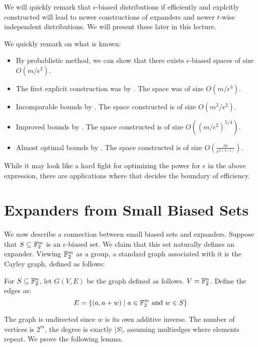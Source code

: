 We will quickly remark that $\epsilon$-biased distributions if efficiently and explcitly constructed will lead to newer constructions of expanders and newer $t$-wise independent distributions. We will present these later in this lecture.

\noindent We quickly remark on what is known:

\begin{itemize}
\item By probablistic method, we can show that there exists $\epsilon$-biased spaces of size $O(m/\epsilon^2)$.
\item The first explicit construction was by \cite{NN90,NN93}. The space was of size $O(m/\epsilon^3)$.
\item Incomparable bounds by \cite{AGHP92}. The space constructed is of size $O(m^2/\epsilon^2)$.
\item Improved bounds by \cite{BT09}. The space constructed is of size $O\left((m/\epsilon^2)^{5/4}\right)$.
\item Almost optimal bounds by \cite{Tas17}. The space constructed is of size $O\left(\frac{m}{\epsilon^{2+o(1)}} \right)$.
\end{itemize}

While it may look like a hard fight for optimizing the power for $\epsilon$ in the above expression, there are applications where that decides the boundary of efficiency.

\section{Expanders from Small Biased Sets}
\label{sec:expanders-from-small-biased-sets}
We now describe a connection between small biased sets and expanders. Suppose that $S \subseteq {\mathbb{F}}_2^m$ is an $\epsilon$-biased set. We claim that this set naturally defines an expander. Viewing ${\mathbb{F}}_2^m$ as a group, a standard graph associated with it is the Cayley graph, defined as follows:

\begin{definition}
For $S \subseteq {\mathbb{F}}_2^n$, let $G(V,E)$ be the graph defined as follows. $V = {\mathbb{F}}_2^n$. Define the edges as:
$$E = \left\{ (a,a+w) \mid a \in {\mathbb{F}}_2^m \textrm{ and } w \in S\right\}$$
\end{definition}

The graph is undirected since $w$ is its own additive inverse. The number of vertices is $2^m$, the degree is exactly $|S|$, assuming multiedges where elements repeat. We prove the following lemma.

